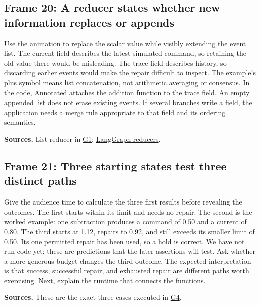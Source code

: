 \documentclass[11pt]{article}
\begin{document}
\subsection*{Frame 20: A reducer states whether new information replaces or appends}
Use the animation to replace the scalar value while visibly extending the event list. The current field describes the latest simulated command, so retaining the old value there would be misleading. The trace field describes history, so discarding earlier events would make the repair difficult to inspect. The example's plus symbol means list concatenation, not arithmetic averaging or consensus. In the code, Annotated attaches the addition function to the trace field. An empty appended list does not erase existing events. If several branches write a field, the application needs a merge rule appropriate to that field and its ordering semantics.\par
\par\nopagebreak\begin{minipage}{\linewidth}{\footnotesize\color{slate}\textbf{Sources.} List reducer in \href{../Graph_Workflow_Lab.ipynb}{G1}; \href{https://docs.langchain.com/oss/python/langgraph/graph-api}{LangGraph reducers}.\par}\end{minipage}\par\medskip
\subsection*{Frame 21: Three starting states test three distinct paths}
Give the audience time to calculate the three first results before revealing the outcomes. The first starts within its limit and needs no repair. The second is the worked example: one subtraction produces a command of 0.50 and a current of 0.80. The third starts at 1.12, repairs to 0.92, and still exceeds its smaller limit of 0.50. Its one permitted repair has been used, so a hold is correct. We have not run code yet; these are predictions that the later assertions will test. Ask whether a more generous budget changes the third outcome. The expected interpretation is that success, successful repair, and exhausted repair are different paths worth exercising. Next, explain the runtime that connects the functions.\par
\par\nopagebreak\begin{minipage}{\linewidth}{\footnotesize\color{slate}\textbf{Sources.} These are the exact three cases executed in \href{../Graph_Workflow_Lab.ipynb}{G4}.\par}\end{minipage}\par\medskip
\end{document}
